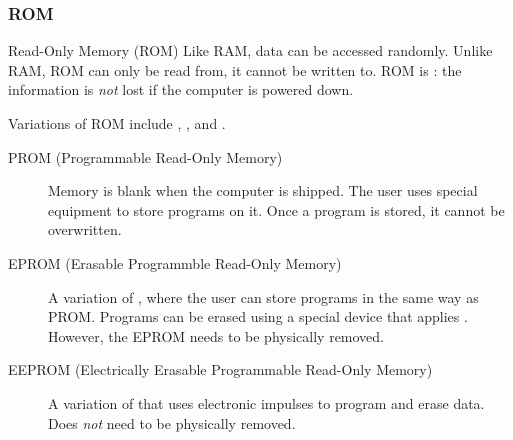 \documentclass[\main/notes.tex]{subfiles}
\begin{document}
				\subsubsection{ROM}
					\begin{definition}{Read-Only Memory (ROM)}
						Like RAM, data can be accessed randomly. Unlike RAM, ROM can only be read from, it cannot be written to. ROM is : the information is \emph{not} lost if the computer is powered down.
					\end{definition}
					Variations of ROM include , , and .
					\begin{indentparagraph}
						\begin{description}
							\item[PROM (Programmable Read-Only Memory)] Memory is blank when the computer is shipped. The user uses special equipment to store programs on it. Once a program is stored, it cannot be overwritten.
							\item[EPROM (Erasable Programmble Read-Only Memory)] A variation of , where the user can store programs in the same way as PROM. Programs can be erased using a special device that applies . However, the EPROM needs to be physically removed.
							\item[EEPROM (Electrically Erasable Programmable Read-Only Memory)] A variation of  that uses electronic impulses to program and erase data. Does \emph{not} need to be physically removed. 
						\end{description}
					\end{indentparagraph}
			\pagebreak
\end{document}

